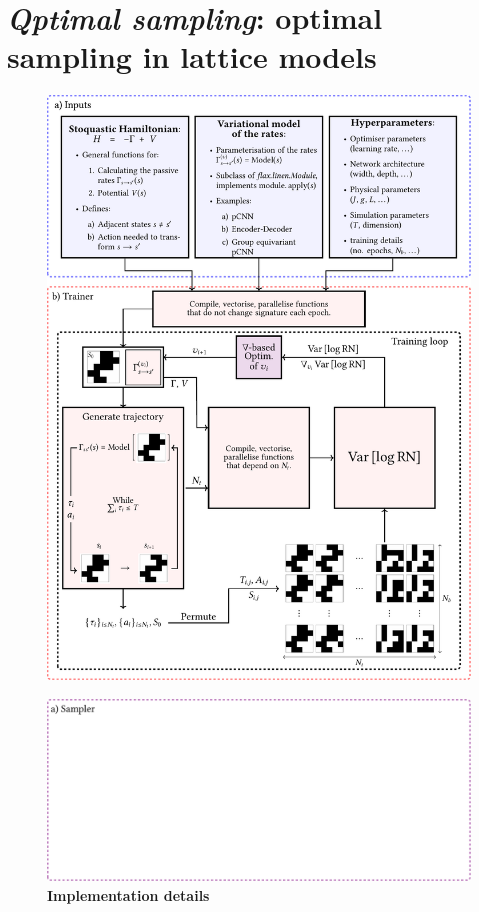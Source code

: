 \section[\emph{Qptimal sampling}]{\emph{Qptimal sampling}: optimal sampling in lattice models}
\begin{figure}[h]
	\centering
	\includegraphics[width=\linewidth]{Chapter4/Figs/Vector/qsampl1}
\end{figure}
\begin{figure}[t]
	\ContinuedFloat
	\centering
	\includegraphics[width=\linewidth]{Chapter4/Figs/Vector/qsampl2}
	\caption[Implementation details]{\textbf{Implementation details}}
	\label{fig:qsampl}
\end{figure}


